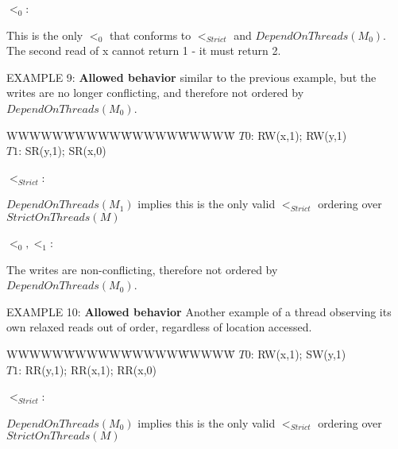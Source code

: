 \bigskip
$<_0$:\hspace{0.5in}
\hspace{0.4in}
\parbox[t]{2.5in}
{This is the only $<_0$ that conforms to $<_{Strict}$ and $DependOnThreads(M_0)$.
The second read of x cannot return 1 - it must return 2.}

\bigskip
\np EXAMPLE 9: \textbf{Allowed behavior} 
similar to the previous example, but the writes are
no longer conflicting, and therefore not ordered by $DependOnThreads(M_0)$.

\begin{tabbing}WWWWW\=WWWWW\=WWWWW\=WWWWW\=\kill
$T0$: \> RW(x,1); \> RW(y,1)\\
$T1$: \> SR(y,1); \> SR(x,0)\\
\end{tabbing}

\bigskip
$<_{Strict}$:\hspace{0.25in}
\hspace{0.4in}
\parbox[t]{2.5in}
{$DependOnThreads(M_1)$ implies this is the only valid $<_{Strict}$ ordering
over $StrictOnThreads(M)$}

\bigskip
$<_0,<_1$:\hspace{0.25in}
\hspace{0.25in}
\parbox[t]{2.5in}
{The writes are non-conflicting, therefore not ordered by $DependOnThreads(M_0)$.}

\bigskip
\np EXAMPLE 10: \textbf{Allowed behavior} 
Another example of a thread observing its own relaxed reads out of order, 
regardless of location accessed.

\begin{tabbing}WWWWW\=WWWWW\=WWWWW\=WWWWW\=\kill
$T0$: \> RW(x,1); \> SW(y,1)\\
$T1$: \> RR(y,1); \> RR(x,1); \> RR(x,0)\\
\end{tabbing}
\pagebreak
$<_{Strict}$:\hspace{0.25in}
\hspace{0.4in}
\parbox[t]{2.5in}
{$DependOnThreads(M_0)$ implies this is the only valid $<_{Strict}$ ordering
over $StrictOnThreads(M)$}

